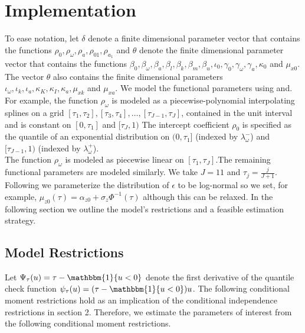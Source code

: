 \documentclass{article}
\begin{document}
\section{Implementation}
To ease notation, let $\delta$ denote a finite dimensional parameter vector that contains the functions $\rho_{0},\rho_{\omega}, \rho_{a}, \rho_{01}, \rho_{a_{1}}$ and $\theta$ denote the finite dimensional parameter vector that contains the functions $\beta_{0}, \beta_{\omega}, \beta_{a}, \beta_{l}, \beta_{k}, \beta_{m}, \beta_{u}, \iota_{0}, \gamma_{0}, \gamma_{\omega}, \gamma_{a}, \kappa_{0}$ and $\mu_{x0}$. The vector $\theta$ also contains the finite dimensional parameters $\iota_{\omega}, \iota_{k}, \iota_{a}, \kappa_{K}, \kappa_{I}, \kappa_{a}, \mu_{xk}$ and $\mu_{xa}$. We model the functional parameters using \cite{Wei2009} and\cite{Arellano2016}. For example, the function $\rho_{\omega}$ is modeled as a piecewise-polynomial interpolating splines on a grid $[\tau_{1},\tau_{2}], [\tau_{3},\tau_{4}],\dots, [\tau_{J-1},\tau_{J}]$, contained in the unit interval and is constant on $[0, \tau_{1}]$ and $[\tau_{J}, 1)$ The intercept coefficient $\rho_{0}$ is specified as the quantile of an exponential distribution on $(0,\tau_{1}]$ (indexed by $\lambda_{\omega}^{-}$) and $[\tau_{J-1}, 1)$ (indexed by $\lambda_{\omega}^{+}$).\\

The function $\rho_{\omega}$ is modeled as piecewise linear on $[\tau_{1}, \tau_{J}]$.The remaining functional parameters are modeled similarly. We take $J=11$ and $\tau_{j}=\frac{j}{J+1}$. Following \cite{Arellano2017} we parameterize the distribution of $\epsilon$ to be log-normal so we set, for example, $\mu_{z0}(\tau)=\alpha_{z0}+\sigma_{z}\Phi^{-1}(\tau)$ although this can be relaxed. In the following section we outline the model's restrictions and a feasible estimation strategy.

\subsection{Model Restrictions}
Let $\Psi_{\tau}(u)=\tau-\mathbbm{1}\{u<0\}$ denote the first derivative of the quantile check function $\psi_{\tau}(u)=(\tau-\mathbbm{1}\{u<0\})u$. The following conditional moment restrictions hold as an implication of the conditional independence restrictions in section 2. Therefore, we estimate the parameters of interest from the following conditional moment restrictions.
\end{document}
